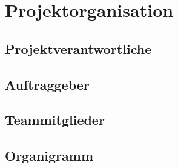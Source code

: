 \section{Projektorganisation}

\subsection{Projektverantwortliche}

\subsection{Auftraggeber}

\subsection{Teammitglieder}

\subsection{Organigramm}
